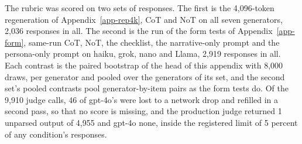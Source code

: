 The rubric was scored on two sets of responses. The first is the 4,096-token
regeneration of Appendix~\ref{app-rep4k}, CoT and NoT on all seven
generators, 2,036 responses in all. The second is the run of the form tests
of Appendix~\ref{app-form}, same-run CoT, NoT, the checklist, the
narrative-only prompt and the persona-only prompt on haiku, grok, nano and
Llama, 2,919 responses in all.
Each contrast is the paired bootstrap of the head of this appendix with
8,000 draws, per generator and pooled over the generators of its set, and
the second set's pooled contrasts pool generator-by-item pairs as the form
tests do.
Of the 9,910 judge calls, 46 of gpt-4o's were lost to a network drop and
refilled in a second pass, so that no score is missing, and the production
judge returned 1 unparsed output of 4,955 and gpt-4o none, inside the
registered limit of 5 percent of any condition's responses.

